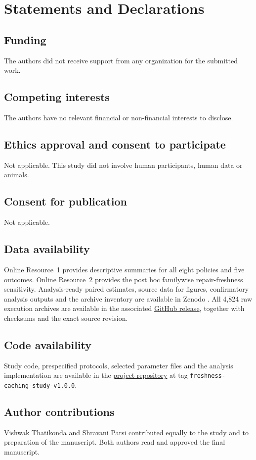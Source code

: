 \documentclass[pdflatex,sn-mathphys-num]{sn-jnl}
\begin{document}
\clearpage
\backmatter

\section*{Statements and Declarations}

\subsection*{Funding}
The authors did not receive support from any organization for the submitted work.

\subsection*{Competing interests}
The authors have no relevant financial or non-financial interests to disclose.

\subsection*{Ethics approval and consent to participate}
Not applicable. This study did not involve human participants, human data or animals.

\subsection*{Consent for publication}
Not applicable.

\subsection*{Data availability}
Online Resource~1 provides descriptive summaries for all eight policies and five outcomes. Online Resource~2 provides the post hoc familywise repair-freshness sensitivity. Analysis-ready paired estimates, source data for figures, confirmatory analysis outputs and the archive inventory are available in Zenodo \cite{freshnessDataset2026}. All 4,824 raw execution archives are available in the associated \href{https://github.com/shravaniparsi/Reinforcement-Learning-Framework/releases/tag/freshness-caching-study-v1.0.0}{GitHub release}, together with checksums and the exact source revision.

\subsection*{Code availability}
Study code, prespecified protocols, selected parameter files and the analysis implementation are available in the \href{https://github.com/shravaniparsi/Reinforcement-Learning-Framework}{project repository} at tag \texttt{freshness-caching-study-v1.0.0}.

\subsection*{Author contributions}
Vishwak Thatikonda and Shravani Parsi contributed equally to the study and to preparation of the manuscript. Both authors read and approved the final manuscript.


\end{document}
